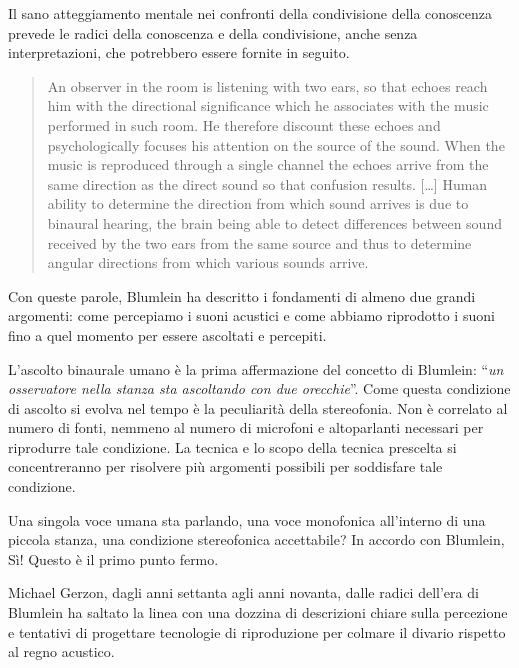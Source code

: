 Il sano atteggiamento mentale nei confronti della condivisione della conoscenza
prevede le radici della conoscenza e della condivisione, anche senza
interpretazioni, che potrebbero essere fornite in seguito.

\begin{quotation}
An observer in the room is listening with two ears, so that echoes reach him
with the directional significance which he associates with the music performed
in such room. He therefore discount these echoes and psychologically focuses
his attention on the source of the sound. When the music is reproduced through
a single channel the echoes arrive from the same direction as the direct sound
so that confusion results. [\ldots] Human ability to determine the direction
from which sound arrives is due to binaural hearing, the brain being able to
detect differences between sound received by the two ears from the same source
and thus to determine angular directions from which various sounds arrive.
\cite{ab58}
\end{quotation}

Con queste parole, Blumlein ha descritto i fondamenti di almeno due grandi argomenti: come percepiamo i suoni acustici e come abbiamo riprodotto i suoni fino a quel momento per essere ascoltati e percepiti.

L'ascolto binaurale umano è la prima affermazione del concetto di Blumlein: “\emph{un osservatore nella stanza sta ascoltando con due orecchie}”. Come questa condizione di ascolto si evolva nel tempo è la peculiarità della stereofonia. Non è correlato al numero di fonti, nemmeno al numero di microfoni e altoparlanti necessari per riprodurre tale condizione. La tecnica e lo scopo della tecnica prescelta si concentreranno per risolvere più argomenti possibili per soddisfare tale condizione.

Una singola voce umana sta parlando, una voce monofonica all'interno di una piccola stanza, una condizione stereofonica accettabile? In accordo con Blumlein, Sì! Questo è il primo punto fermo.

Michael Gerzon, dagli anni settanta agli anni novanta, dalle radici dell'era di Blumlein ha saltato la linea con una dozzina di descrizioni chiare sulla percezione e tentativi di progettare tecnologie di riproduzione per colmare il divario rispetto al regno acustico.

